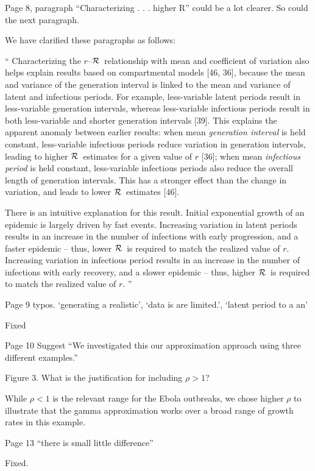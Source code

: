 \documentclass[12pt]{article}
\newcommand{\rR}{\mbox{$r$--$\cal R$}}
\newcommand{\RR}{\ensuremath{{\cal R}}}
\newcommand{\revtext}{\textsf}
\begin{document}
\revtext{Page 8, paragraph “Characterizing . . . higher R” could be a lot clearer. So could the next paragraph.}

We have clarified these paragraphs as follows:

``
Characterizing the \rR\ relationship with mean and coefficient of variation also helps explain results based on compartmental models [46, 36], because the mean and variance of the generation interval is linked to the mean and variance of latent and infectious periods.
For example, less-variable latent periods result in less-variable generation intervals, whereas less-variable infectious periods result in both less-variable and shorter generation intervals [39].
This explains the apparent anomaly between earlier results: 
when mean \emph{generation interval} is held constant, less-variable infectious periods reduce variation in generation intervals, leading to higher \RR\ estimates for a given value of $r$ [36];
when mean \emph{infectious period} is held constant, less-variable infectious periods also reduce the overall length of generation intervals. This has a stronger effect than the change in variation, and leads to lower \RR\ estimates [46].

There is an intuitive explanation for this result.
Initial exponential growth of an epidemic is largely driven by fast events.
Increasing variation in latent periods results in an increase in the number of infections with early progression, and a faster epidemic -- thus, lower \RR\ is required to match the realized value of $r$.
Increasing variation in infectious period results in an increase in the number of infections with early recovery, and a slower epidemic -- thus, higher \RR\ is required to match the realized value of $r$.
''


\revtext{Page 9 typos. ‘generating a realistic’, ‘data is are limited.’, ‘latent period to a an’}

Fixed

\revtext{Page 10 Suggest “We investigated this our approximation approach using three different examples.”}

\revtext{Figure 3. What is the justification for including $\rho > 1$?}

While $\rho < 1$ is the relevant range for the Ebola outbreaks, we chose higher $\rho$ to illustrate that the gamma approximation works over a broad range of growth rates in this example.

\revtext{Page 13 “there is small little difference”}

Fixed.
\end{document}
